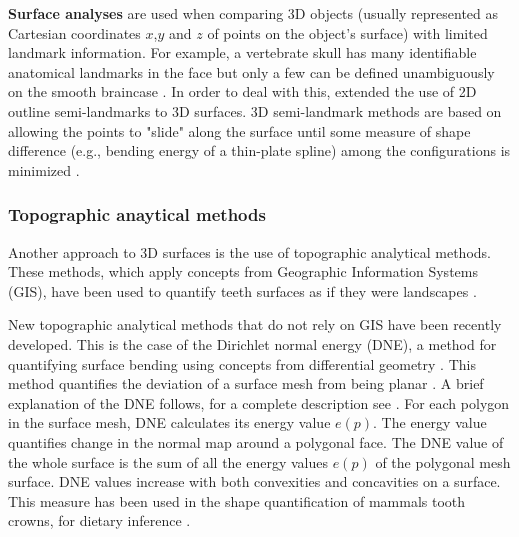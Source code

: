 \textbf{Surface analyses} are used when comparing 3D objects (usually represented as Cartesian coordinates $x$,$y$ and $z$ of points on the object's surface) with limited landmark information. For example, a vertebrate skull has many identifiable anatomical landmarks in the face but only a few can be defined unambiguously on the smooth braincase \citep{Mitteroecker2009}. In order to deal with this, \citealp{Gunz2005} extended the use of 2D outline semi-landmarks to 3D surfaces. 3D semi-landmark methods are based on allowing the points to "slide" along the surface until some measure of shape difference (e.g., bending energy of a thin-plate spline) among the configurations is minimized \citep{Mitteroecker2009}.


\subsubsection{Topographic anaytical methods}
\label{DNE_explanation}

Another approach to 3D surfaces is the use of topographic analytical methods. These methods, which apply concepts from Geographic Information Systems (GIS), have been used to quantify teeth surfaces as if they were landscapes \citep{jernvall1999laser,Winchester2014}.  

New topographic analytical methods that do not rely on GIS have been recently developed. This is the case of the Dirichlet normal energy (DNE), a method for quantifying surface bending using concepts from differential geometry \citep{Bunn2011}. This method quantifies the deviation of a surface mesh from being planar \citep{Bunn2011}. A brief explanation of the DNE follows, for a complete description see \citep{Bunn2011,Winchester2016}. For each polygon in the surface mesh, DNE calculates its energy value $e(p)$. The energy value quantifies change in the normal map around a polygonal face. The DNE value of the whole surface is the sum of all the energy values $e(p)$ of the polygonal mesh surface. DNE values increase with both convexities and concavities on a surface. This measure has been used in the shape quantification of mammals tooth crowns, for dietary inference \citep{Bunn2011}.

